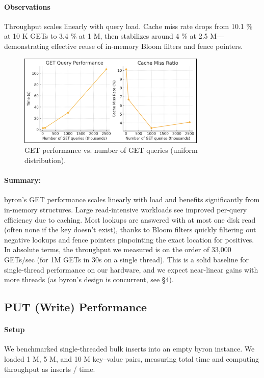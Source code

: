 \documentclass[10pt]{article}
\begin{document}
\paragraph{Observations}
Throughput scales linearly with query load. Cache miss rate drops from 10.1 \% at 10 K GETs to 3.4 \% at 1 M, then stabilizes around 4 \% at 2.5 M—demonstrating effective reuse of in‐memory Bloom filters and fence pointers.

\begin{figure}[htbp]
  \centering
  \includegraphics[width=0.8\textwidth]{get_performance.png}
  \caption{GET performance vs. number of GET queries (uniform distribution).}
  \label{fig:get_performance}
\end{figure}

\paragraph{Summary:} byron’s GET performance scales linearly with load and benefits significantly from in-memory structures. Large read-intensive workloads see improved per-query efficiency due to caching. Most lookups are answered with at most one disk read (often none if the key doesn’t exist), thanks to Bloom filters quickly filtering out negative lookups and fence pointers pinpointing the exact location for positives. In absolute terms, the throughput we measured is on the order of 33,000 GETs/sec (for 1M GETs in 30s on a single thread). This is a solid baseline for single-thread performance on our hardware, and we expect near-linear gains with more threads (as byron’s design is concurrent, see §4).

\subsection{PUT (Write) Performance}

\paragraph{Setup}
We benchmarked single-threaded bulk inserts into an empty byron instance.  
We loaded 1 M, 5 M, and 10 M key–value pairs, measuring total time and computing throughput as inserts / time.
\end{document}
